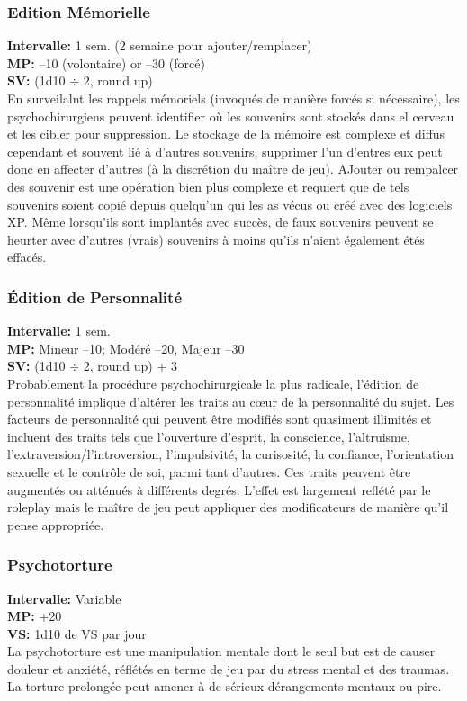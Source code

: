 \subsubsection{Edition Mémorielle} \textbf{Intervalle:} 1 sem. (2 semaine pour ajouter/remplacer) \\ \textbf{MP:} –10 (volontaire) or –30 (forcé) \\ \textbf{SV:} (1d10 $\div$ 2, round up) \\ En surveilalnt les rappels mémoriels (invoqués de manière forcés si nécessaire), les psychochirurgiens peuvent identifier où les souvenirs sont stockés dans el cerveau et les cibler pour suppression. Le stockage de la mémoire est complexe et diffus cependant et souvent lié à d'autres souvenirs, supprimer l'un d'entres eux peut donc en affecter d'autres (à la discrétion du maître de jeu). AJouter ou rempalcer des souvenir est une opération bien plus complexe et requiert que de tels souvenirs soient copié depuis quelqu'un qui les as vécus ou créé avec des logiciels XP. Même lorsqu'ils sont implantés avec succès, de faux souvenirs peuvent se heurter avec d'autres (vrais) souvenirs à moins qu'ils n'aient également étés effacés. 

\subsubsection{Édition de Personnalité} \textbf{Intervalle:} 1 sem.\\ \textbf{MP:} Mineur –10; Modéré –20, Majeur –30 \\ \textbf{SV:} (1d10 $\div$ 2, round up) + 3 \\ Probablement la procédure psychochirurgicale la plus radicale, l'édition de personnalité implique d'altérer les traits au cœur de la personnalité du sujet. Les facteurs de personnalité qui peuvent être modifiés sont quasiment illimités et incluent des traits tels que l'ouverture d'esprit, la conscience, l'altruisme, l'extraversion/l'introversion, l'impulsivité, la curisosité, la confiance, l'orientation sexuelle et le contrôle de soi, parmi tant d'autres. Ces traits peuvent être augmentés ou atténués à différents degrés. L'effet est largement reflété par le roleplay mais le maître de jeu peut appliquer des modificateurs de manière qu'il pense appropriée. 

\subsubsection{Psychotorture} \textbf{Intervalle:} Variable \\ \textbf{MP:} +20 \\ \textbf{VS:} 1d10 de VS par jour\\ La psychotorture est une manipulation mentale dont le seul but est de causer douleur et anxiété, réflétés en terme de jeu par du stress mental et des traumas. La torture prolongée peut amener à de sérieux dérangements mentaux ou pire. 

